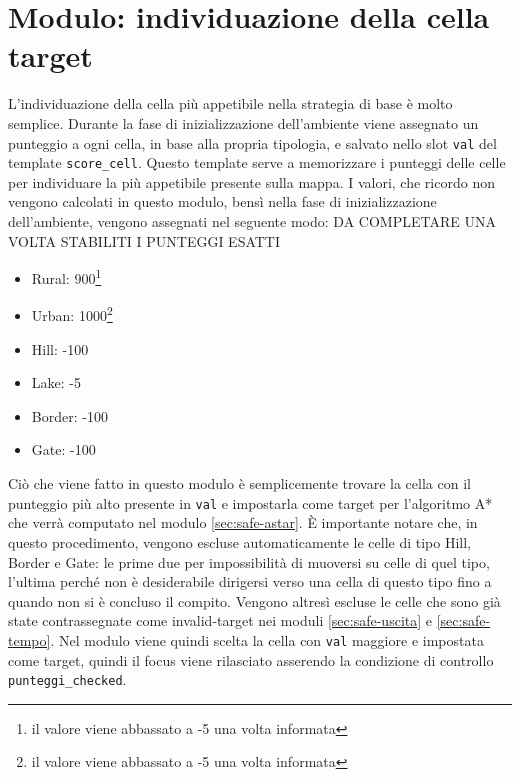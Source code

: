 \section{Modulo: individuazione della cella target} \label{sec:safe-target}
L'individuazione della cella più appetibile nella strategia di base è molto semplice. Durante la fase di inizializzazione dell'ambiente viene assegnato un punteggio a ogni cella, in base alla propria tipologia, e salvato nello slot \texttt{val} del template \texttt{score\_cell}. Questo template serve a memorizzare i punteggi delle celle per individuare la più appetibile presente sulla mappa. I valori, che ricordo non vengono calcolati in questo modulo, bensì nella fase di inizializzazione dell'ambiente, vengono assegnati nel seguente modo: {\color{red}DA COMPLETARE UNA VOLTA STABILITI I PUNTEGGI ESATTI}
\begin{itemize}
	\item Rural: 900\footnote{il valore viene abbassato a -5 una volta informata}
	\item Urban: 1000\footnote{il valore viene abbassato a -5 una volta informata}
	\item Hill: -100
	\item Lake: -5
	\item Border: -100
	\item Gate: -100
\end{itemize}
Ciò che viene fatto in questo modulo è semplicemente trovare la cella con il punteggio più alto presente in \texttt{val} e impostarla come target per l'algoritmo A* che verrà computato nel modulo \ref{sec:safe-astar}. È importante notare che, in questo procedimento, vengono escluse automaticamente le celle di tipo Hill, Border e Gate: le prime due per impossibilità di muoversi su celle di quel tipo, l'ultima perché non è desiderabile dirigersi verso una cella di questo tipo fino a quando non si è concluso il compito.
Vengono altresì escluse le celle che sono già state contrassegnate come invalid-target nei moduli \ref{sec:safe-uscita} e \ref{sec:safe-tempo}.
Nel modulo viene quindi scelta la cella con \texttt{val} maggiore e impostata come target, quindi il focus viene rilasciato asserendo la condizione di controllo \texttt{punteggi\_checked}.

